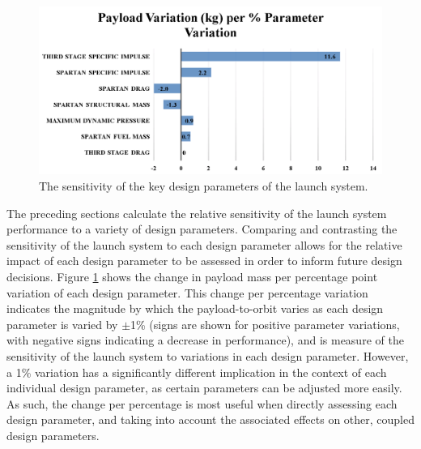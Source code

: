 
\begin{figure}[ht!]
	\centering
	\includegraphics[width=0.99\linewidth]{figures/5_Ascent/BarChartRelativePayloadChange}
	\caption{The sensitivity of the key design parameters of the launch system.}
	\label{fig:BarChartRelativePayloadChange}
\end{figure}

The preceding sections calculate the relative sensitivity of the launch system performance to a variety of design parameters. 
Comparing and contrasting the sensitivity of the launch system to each design parameter allows for the relative impact of each design parameter to be assessed in order to inform future design decisions. 
Figure \ref{fig:BarChartRelativePayloadChange} shows the change in payload mass per percentage point variation of each design parameter. 
This change per percentage variation indicates the magnitude by which the payload-to-orbit varies as each design parameter is varied by $\pm$1\% (signs are shown for positive parameter variations, with negative signs indicating a decrease in performance), and is measure of the sensitivity of the launch system to variations in each design parameter. 
However, a 1\% variation has a significantly different implication in the context of each individual design parameter, as certain parameters can be adjusted more easily. 
As such, the change per percentage is most useful when directly assessing each design parameter, and taking into account the associated effects on other, coupled design parameters. 

